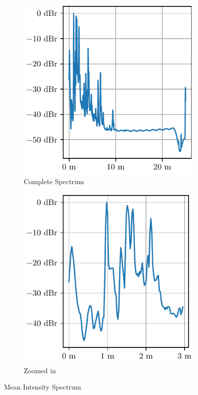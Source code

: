 \begin{figure}[h]
    \centering
    \begin{subfigure}[t]{.45\textwidth}
        \centering
        \includegraphics[width=\textwidth]{../figures/interference.pdf}
        \caption{Complete Spectrum}
    \end{subfigure}
    \begin{subfigure}[t]{.45\textwidth}
        \centering
        \includegraphics[width=\textwidth]{../figures/interference_zoom.pdf}
        \caption{Zoomed in}
    \end{subfigure}
    \caption{Mean Intensity Spectrum}
    \label{fig:avg_intensity}
\end{figure}
